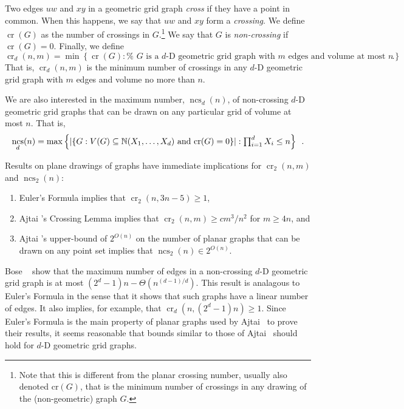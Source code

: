 \documentclass{patmorin}
\DeclareMathOperator{\crs}{cr}
\DeclareMathOperator{\ncs}{ncs}
\begin{document}
Two edges $uw$ and $xy$ in a geometric grid graph \emph{cross} if they have a
point in common.  When this happens, we say that $uw$ and $xy$ form
a \emph{crossing}.  We define $\crs(G)$ as the number of crossings
in $G$.\footnote{Note that this is different from the planar crossing
number, usually also denoted $\mathrm{cr}(G)$, that is the minimum number of
crossings in any drawing of the (non-geometric) graph $G$.}  We say that
$G$ is \emph{non-crossing} if $\crs(G)=0$.  Finally, we define
\[ \crs_d(n,m)=\min\left\{\crs(G):\mbox{%
    $G$ is a $d$-D geometric grid graph with $m$ edges and volume at most $n$}
   \right\} \enspace .
\]
That is, $\crs_d(n,m)$ is the minimum number of crossings in any
$d$-D geometric grid graph with $m$ edges and volume no more
than $n$.

We are also interested in the maximum number, $\ncs_d(n)$, of non-crossing
$d$-D geometric grid graphs that can be drawn on any particular grid of
volume at most $n$.  That is,
\[
  \ncs_d(n) = \max\left\{
     \left|\left\{G:\mbox{$V(G)\subseteq\N(X_1,\ldots,X_d)$
            and $\crs(G)=0$} \right\}\right| :
    \mbox{$\prod_{i=1}^d X_i \le n$} \right\} \enspace .
\]

Results on plane drawings of graphs have immediate implications
for $\crs_2(n,m)$ and $\ncs_2(n)$:
\begin{enumerate}
  \item  Euler's Formula implies that $\crs_2(n,3n-5)\ge 1$,
  \item  Ajtai \etal's Crossing Lemma implies that $\crs_2(n,m)\ge
  cm^3/n^2$ for $m\ge 4n$, and
  \item  Ajtai \etal's upper-bound of $2^{O(n)}$ on the number of planar
  graphs that can be drawn on any point set implies that $\ncs_2(n)\in
  2^{O(n)}$.
\end{enumerate}

Bose \etal~\cite{bose.czyzowicz.ea:maximum} show that the maximum
number of edges in a non-crossing $d$-D geometric grid graph is at most
$(2^d-1)n-\Theta(n^{(d-1)/d})$. This result is analagous to Euler's
Formula in the sense that it shows that such graphs have a linear number
of edges.  It also implies, for example, that $\crs_d(n,(2^d-1)n)\ge 1$.
Since Euler's Formula is the main property of planar graphs used by Ajtai
\etal\ to prove their results, it seems reasonable that bounds similar
to those of Ajtai \etal\ should hold for $d$-D geometric grid graphs.
\end{document}
